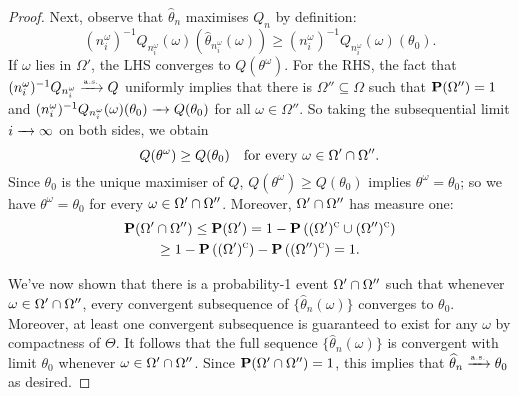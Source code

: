 \documentclass[11pt,letterpaper,reqno,oneside]{article}
\begin{document}
\begin{proof}
	Next, observe that $\widehat{\theta}_n$ maximises $Q_n$ by definition:
	\begin{equation*}
		(n^\omega_i)^{-1} Q_{n^\omega_i}(\omega)
		\left( \widehat{\theta}_{n^\omega_i}(\omega) \right)
		\geq (n^\omega_i)^{-1} Q_{n^\omega_i}(\omega)(\theta_0) .
	\end{equation*}
	If $\omega$ lies in $\Omega'$, the LHS converges to $Q( \theta^\omega )$. For the RHS, the fact that $(n^\omega_i)^{-1} Q_{n^\omega_i} \xrightarrow{{\scriptscriptstyle \mathrm{a.s.}}} Q$ uniformly implies that there is $\Omega'' \subseteq \Omega$ such that $\mathbf{P}(\Omega'')=1$ and $(n^\omega_i)^{-1} Q_{n^\omega_i}(\omega)(\theta_0) \xrightarrow{\;\;\;} Q(\theta_0)$ for all $\omega \in \Omega''$. So taking the subsequential limit $i\xrightarrow{\;\;\;}\infty$ on both sides, we obtain
	\begin{equation*}
		Q( \theta^\omega ) \geq Q(\theta_0)
		\quad\text{for every $\omega \in \Omega' \cap \Omega''$} .
	\end{equation*}
	Since $\theta_0$ is the unique maximiser of $Q$, $Q( \theta^\omega ) \geq Q(\theta_0)$ implies $\theta^\omega = \theta_0$; so we have $\theta^\omega = \theta_0$ for every $\omega \in \Omega' \cap \Omega''$. Moreover, $\Omega' \cap \Omega''$ has measure one:
	\begin{multline*}
		\mathbf{P}( \Omega' \cap \Omega'') \leq \mathbf{P}(\Omega') 
		= 1 - \mathbf{P}\left( (\Omega')^{\textsc{c}} \cup (\Omega'')^{\textsc{c}} \right) 
		\\
		\geq 1 - \mathbf{P}\left( (\Omega')^{\textsc{c}} \right) - \mathbf{P}\left( (\Omega'')^{\textsc{c}} \right) 
		= 1 .
	\end{multline*}

	We've now shown that there is a probability-1 event $\Omega' \cap \Omega''$ such that whenever $\omega \in \Omega' \cap \Omega''$, every convergent subsequence of $\bigl\{ \widehat{\theta}_n(\omega) \bigr\}$ converges to $\theta_0$. Moreover, at least one convergent subsequence is guaranteed to exist for any $\omega$ by compactness of $\Theta$. It follows that the full sequence $\bigl\{ \widehat{\theta}_n(\omega) \bigr\}$ is convergent with limit $\theta_0$ whenever $\omega \in \Omega' \cap \Omega''$. Since $\mathbf{P}(\Omega'\cap\Omega'')=1$, this implies that $\widehat{\theta}_n \xrightarrow{{\scriptscriptstyle \mathrm{a.s.}}} \theta_0$ as desired.
\end{proof}
\end{document}
